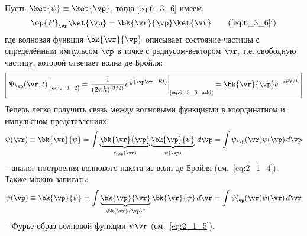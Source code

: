 Пусть $\ket{\psi}\equiv\ket{\vp}$, тогда \eqref{eq:6_3_6} имеем:
\begin{equation}
\label{eq:6_3_6_add}
\op{P}_{\vr}\ket{\vp}=\bk{\vr}{\vp}\ket{\vr}
\tag{\ref{eq:6_3_6}$'$}
\end{equation}%
%
где волновая функция $\bk{\vr}{\vp}$ описывает состояние частицы с определённым импульсом $\vp$ в точке с радиусом-вектором $\vr$, т.е. свободную частицу, которой отвечает волна де Бройля:%
%
\begin{equation}
\label{eq:6_3_9}
\boxed{
	\left. \Psi_{\vp}(\vr,t) \right|_{\text{\eqref{eq:2_1_2}}} = 
	\left. \frac{1}{(2\pi \hbar)^{(3/2)}} e^{\frac{i}{h} (\vp\vr-Et)}  \right|_{\text{\eqref{eq:6_3_6_add}}} = 
	\bk{\vr}{\vp} e^{-iEt/\hbar}
}
\end{equation}%
%
Теперь легко получить связь между волновыми функциями в координатном и импульсном представлениях:%
%
\begin{equation}
\label{eq:6_3_10}
\psi(\vr) \equiv \bk{\vr}{\psi} = 
\int \underbrace{  \bk{\vr}{\vp}  }_ {\psi_{\vp}(\vr)}  \underbrace{ \bk{\vp}{\psi} }_{\psi(\vp)} \, d\vp =
\int \psi_{\vp}(\vr) \psi(\vp) \, d\vp
\end{equation}%
-- аналог построения волнового пакета из волн де Бройля (см.~\eqref{eq:2_1_4}). Также можно записать:%
%
\begin{equation}
\label{eq:6_3_11}
\psi(\vp) \equiv \bk{\vp}{\psi} = 
\int \underbrace{  \bk{\vp}{\vr}  }_ {\bk{\vr}{\vp}^*} \bk{\vr}{\psi} \, d\vr =
\int \psi^*_{\vp}(\vr) \psi(\vr) \, d\vr
\end{equation}%
-- Фурье-образ волновой функции $\psi{\vr}$ (см.~\eqref{eq:2_1_5}). 

